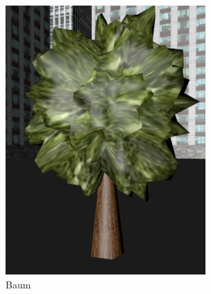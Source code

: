 \begin{figure}[htbp]
\centering 
\includegraphics[scale=0.4]{src/screenshot_tree.png}
\caption{Baum} %
\label{screenshot_tree} %
\end{figure}

